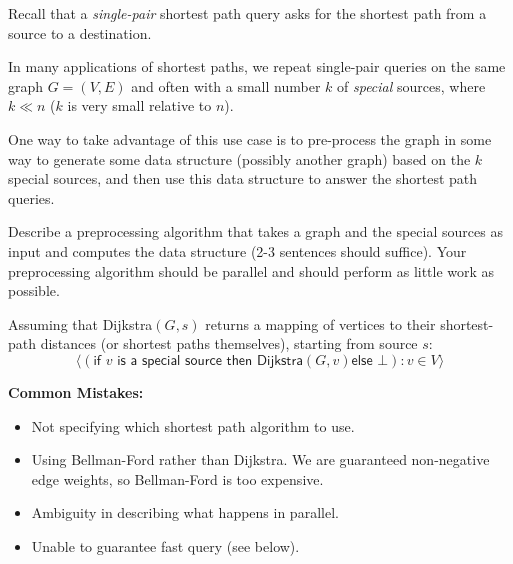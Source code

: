 \begin{problem}
Recall that a {\em single-pair} shortest path query asks for the
shortest path from a source to a destination.
%

In many applications of shortest paths, we repeat single-pair queries
on the same graph $G = (V,E)$ and often with a small number $k$ of
{\em special} sources, where $k \ll n$ ($k$ is very small relative to
$n$).


One way to take advantage of this use case is to pre-process the graph
in some way to generate some data structure (possibly another graph)
based on the $k$ special sources, and then use this data structure to
answer the shortest path queries.


\ask[4] Describe a preprocessing algorithm that takes a graph
  and the special sources as input and computes the data structure (2-3
  sentences should suffice).  Your preprocessing algorithm should be
  parallel and should perform as little work as possible.


\sol

  Assuming that \textsf{Dijkstra$(G, s)$} returns a mapping of vertices to
  their shortest-path distances (or shortest paths themselves), starting from
  source $s$:
  \[
    \big\langle (\textsf{if $v$ is a special source then Dijkstra$(G,v)$
    else $\bot$}) : v \in V \big\rangle
  \]

%
%

\notes
\textbf{Common Mistakes:}
\begin{itemize}
  \item Not specifying which shortest path algorithm to use.
  \item Using Bellman-Ford rather than Dijkstra. We are guaranteed non-negative
  edge weights, so Bellman-Ford is too expensive.
  \item Ambiguity in describing what happens in parallel.
  \item Unable to guarantee fast query (see below).
\end{itemize}



\end{problem}
